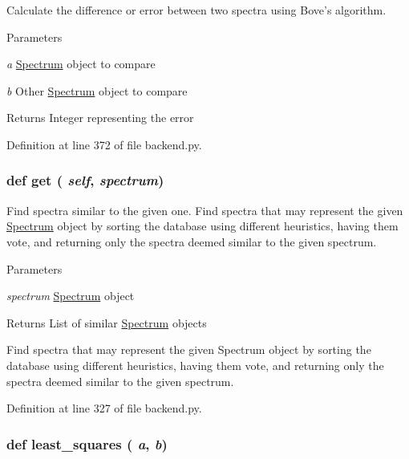 Calculate the difference or error between two spectra using Bove's algorithm. 
\begin{DoxyParams}{Parameters}
\item[{\em a}]\hyperlink{classbackend_1_1_spectrum}{Spectrum} object to compare \item[{\em b}]Other \hyperlink{classbackend_1_1_spectrum}{Spectrum} object to compare \end{DoxyParams}
\begin{DoxyReturn}{Returns}
Integer representing the error 
\end{DoxyReturn}


Definition at line 372 of file backend.py.\hypertarget{classbackend_1_1_matcher_a444a1328efb32d5d9d2dcb2efe855d3b}{
\subsubsection[{get}]{\setlength{\rightskip}{0pt plus 5cm}def get ( {\em self}, \/   {\em spectrum})}}
\label{classbackend_1_1_matcher_a444a1328efb32d5d9d2dcb2efe855d3b}


Find spectra similar to the given one. Find spectra that may represent the given \hyperlink{classbackend_1_1_spectrum}{Spectrum} object by sorting the database using different heuristics, having them vote, and returning only the spectra deemed similar to the given spectrum.


\begin{DoxyParams}{Parameters}
\item[{\em spectrum}]\hyperlink{classbackend_1_1_spectrum}{Spectrum} object \end{DoxyParams}
\begin{DoxyReturn}{Returns}
List of similar \hyperlink{classbackend_1_1_spectrum}{Spectrum} objects\begin{DoxyVerb}Find spectra that may represent the given Spectrum object by sorting
the database using different heuristics, having them vote, and returning only
the spectra deemed similar to the given spectrum.\end{DoxyVerb}
 
\end{DoxyReturn}


Definition at line 327 of file backend.py.\hypertarget{classbackend_1_1_matcher_ab324f6c7c11f54b7617ecdee14f76049}{
\subsubsection[{least\_\-squares}]{\setlength{\rightskip}{0pt plus 5cm}def least\_\-squares ( {\em a}, \/   {\em b})}}
\label{classbackend_1_1_matcher_ab324f6c7c11f54b7617ecdee14f76049}


